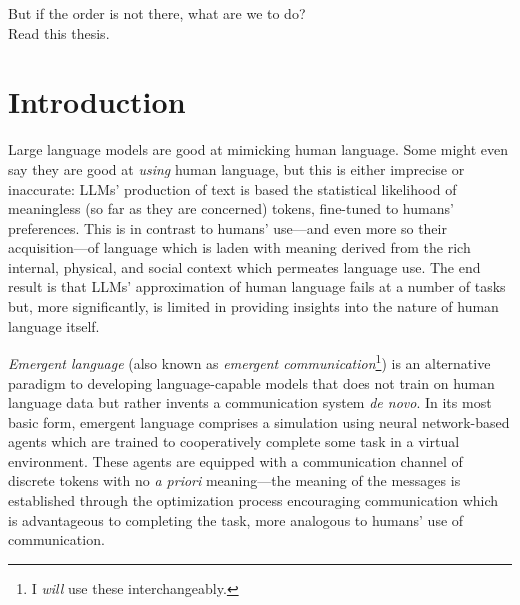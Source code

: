 \vfill
\begin{center}
But if the order is not there, what are we to do? \\
\bigskip
Read this thesis.
\end{center}
\vfill





\chapter{Introduction}

Large language models are good at mimicking human language.
Some might even say they are good at \emph{using} human language, but this is either imprecise or inaccurate:
  LLMs' production of text is based the statistical likelihood of meaningless (so far as they are concerned) tokens, fine-tuned to humans' preferences.
This is in contrast to humans' use---and even more so their acquisition---of language which is laden with meaning derived from the rich internal, physical, and social context which permeates language use.
The end result is that LLMs' approximation of human language fails at a number of tasks but, more significantly, is limited in providing insights into the nature of human language itself.

\emph{Emergent language} (also known as \emph{emergent communication}\footnote{I \emph{will} use these interchangeably.}) is an alternative paradigm to developing language-capable models that does not train on human language data but rather invents a communication system \emph{de novo}.
In its most basic form, emergent language comprises a simulation using neural network-based agents which are trained to cooperatively complete some task in a virtual environment.
These agents are equipped with a communication channel of discrete tokens with no \emph{a priori} meaning---the meaning of the messages is established through the optimization process encouraging communication which is advantageous to completing the task, more analogous to humans' use of communication.

